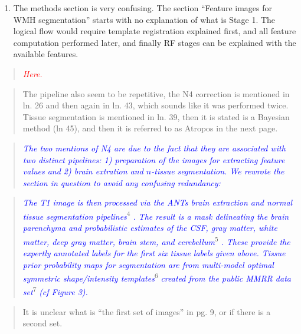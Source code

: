 \documentclass[12pt,]{article}
\providecommand{\tightlist}{%
  \setlength{\itemsep}{0pt}\setlength{\parskip}{0pt}}
\begin{document}
\begin{enumerate}
\def\labelenumi{\arabic{enumi}.}
\setcounter{enumi}{5}
\tightlist
\item
  The methods section is very confusing. The section ``Feature images
  for WMH segmentation'' starts with no explanation of what is Stage 1.
  The logical flow would require template registration explained first,
  and all feature computation performed later, and finally RF stages can
  be explained with the available features.
\end{enumerate}

\begin{quote}
\emph{\textcolor{red}{Here.}}
\end{quote}

\begin{quote}
The pipeline also seem to be repetitive, the N4 correction is mentioned
in ln. 26 and then again in ln. 43, which sounds like it was performed
twice. Tissue segmentation is mentioned in ln. 39, then it is stated is
a Bayesian method (ln 45), and then it is referred to as Atropos in the
next page.
\end{quote}

\begin{quote}
\emph{\textcolor{blue}{The two mentions of N4 are due to the fact that they are associated
with two distinct pipelines:  1) preparation of the images for extracting feature values
and 2) brain extration and $n$-tissue segmentation.  We rewrote the section in question
to avoid any confusing redundancy:}}
\end{quote}

\begin{quote}
\emph{\textcolor{blue}{The T1 image is then processed via the ANTs brain
extraction and normal tissue segmentation pipelines}}\textsuperscript{4}
\emph{\textcolor{blue}{.  The result is a mask delineating the brain
parenchyma and probabilistic estimates of the CSF, gray matter, white matter,
deep gray matter, brain stem, and cerebellum}}\textsuperscript{5}
\emph{\textcolor{blue}{.  These provide the expertly annotated labels for the
first six tissue labels given above.  Tissue prior probability maps for segmentation
are from multi-model optimal symmetric shape/intensity templates}}\textsuperscript{6}
\emph{\textcolor{blue}{created from the public MMRR data set}}\textsuperscript{7}
\emph{\textcolor{blue}{(cf Figure 3).}}
\end{quote}

\begin{quote}
It is unclear what is ``the first set of images'' in pg. 9, or if there
is a second set.
\end{quote}
\end{document}
